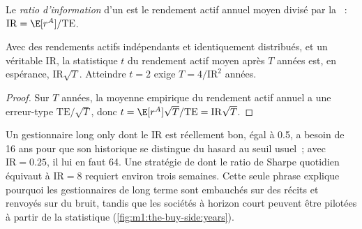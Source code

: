 \begin{definition}\label{def:m1:the-buy-side:ir}
Le \emph{ratio d'information} d'un  est le
rendement actif annuel moyen divisé par la ~:
$\mathrm{IR} = \E[r^A]/\mathrm{TE}$.
\end{definition}

\begin{proposition}\label{prop:m1:the-buy-side:years}
Avec des rendements actifs indépendants et identiquement distribués, et un  véritable $\mathrm{IR}$, la statistique $t$ du rendement actif moyen
après $T$ années est, en espérance, $\mathrm{IR}\sqrt{T}$. Atteindre $t = 2$
exige $T = 4/\mathrm{IR}^2$ années.
\end{proposition}
\begin{proof}
Sur $T$ années, la moyenne empirique du rendement actif annuel a une
erreur-type $\mathrm{TE}/\sqrt{T}$, donc $t = \E[r^A]\sqrt{T}/\mathrm{TE} =
\mathrm{IR}\sqrt{T}$.
\end{proof}

\begin{example}\label{ex:m1:the-buy-side:sixteen}
Un gestionnaire long only dont le $\mathrm{IR}$ est réellement bon, égal à 0.5, a besoin de 16
ans pour que son historique se distingue du hasard au seuil usuel~; avec $\mathrm{IR} = 0.25$, il lui en faut 64.
Une stratégie de  dont le ratio de Sharpe quotidien équivaut à $\mathrm{IR} = 8$
requiert environ trois semaines. Cette seule phrase explique pourquoi les gestionnaires de long terme
sont embauchés sur des récits et renvoyés sur du bruit, tandis que les sociétés à horizon court peuvent
être pilotées à partir de la statistique
(\cref{fig:m1:the-buy-side:years}).
\end{example}

